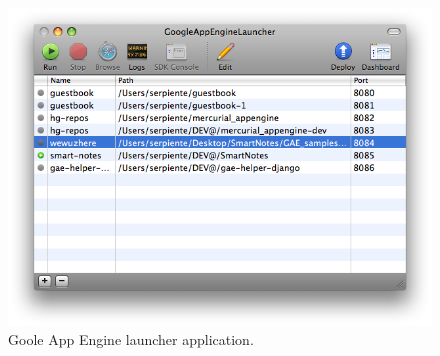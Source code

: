 \begin{figure}[h]
\begin{center}
\includegraphics[scale=0.4]{img/gae_launcher.png}
\caption{Goole App Engine launcher application.}
\label{gae_launcher}
\end{center}
\end{figure}

